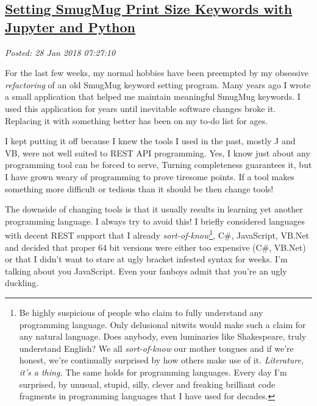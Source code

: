 %

\subsection*{\href{http://analyzethedatanotthedrivel.org/2018/01/28/setting-smugmug-print-size-keywords-with-jupyter-and-python/}{Setting SmugMug Print Size Keywords with Jupyter and Python}}


\noindent\emph{Posted: 28 Jan 2018 07:27:10}
\vspace{6pt}

For the last few weeks, my normal hobbies have been preempted by my
obsessive \emph{refactoring} of an old SmugMug keyword setting program.
Many years ago I wrote a small application that helped me maintain
meaningful SmugMug keywords. I used this application for years until
inevitable software changes broke it. Replacing it with something better
has been on my to-do list for ages.

I kept putting it off because I knew the tools I used in the past,
mostly J and VB, were not well suited to REST API programming. Yes, I
know just about any programming tool can be forced to serve, Turning
completeness guarantees it, but I have grown weary of programming to
prove tiresome points. If a tool makes something more difficult or
tedious than it should be then change tools!

The downside of changing tools is that it usually results in learning
yet another programming language. I always try to avoid this! I briefly
considered languages with decent REST support that I already
\emph{sort-of-know}\footnote{Be highly suspicious of people who claim to fully understand any
  programming language. Only delusional nitwits would make such a claim
  for any natural language. Does anybody, even luminaries like
  Shakespeare, truly understand English? We all \emph{sort-of-know} our
  mother tongues and if we're honest, we're continually surprised by how
  others make use of it. \emph{Literature, it's a thing.} The same holds
  for programming languages. Every day I'm surprised, by unusual,
  stupid, silly, clever and freaking brilliant code fragments in
  programming languages that I have used for
  decades.
}, C\#,
JavaScript, VB.Net and decided that proper 64 bit versions were either
too expensive (C\#, VB.Net) or that I didn't want to stare at ugly
bracket infested syntax for weeks. I'm talking about you JavaScript.
Even your fanboys admit that you're an ugly duckling.

